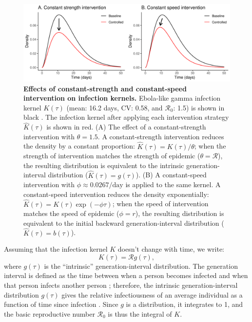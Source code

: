 \documentclass[12pt]{article}
\newcommand{\Rx}[1]{\ensuremath{{\mathcal R}_{#1}}}
\newcommand{\Ro}{\Rx{0}}
\newcommand{\RR}{\ensuremath{{\mathcal R}}}
\newcommand{\figlab}[1]{\label{fig:#1}}
\newcommand{\eqlab}[1]{\label{eq:#1}}
\begin{document}
\begin{figure}[!t]
\includegraphics[width=\textwidth]{../figure/constant_intervention.pdf}
\caption{
\textbf{Effects of constant-strength and constant-speed intervention on infection kernels.}
Ebola-like gamma infection kernel $K(\tau)$ (mean: 16.2 days, CV: 0.58, and \Ro: 1.5) is shown in black \citep{park2019practical}.
The infection kernel after applying each intervention strategy $\hat K(\tau)$ is shown in red.
(A) The effect of a constant-strength intervention with $\theta = 1.5$.
A constant-strength intervention reduces the density by a constant proportion: $\hat K(\tau) = K(\tau)/\theta$; when the strength of intervention matches the strength of epidemic ($\theta = \mathcal R$), the resulting distribution is equivalent to the intrinsic generation-interval distribution ($\hat K(\tau) = g(\tau)$).
(B) A constant-speed intervention with $\phi \approx 0.0267/\mathrm{day}$ is applied to the same kernel.
A constant-speed intervention reduces the density exponentially: $\hat K(\tau) = K(\tau) \exp(-\phi \tau)$; when the speed of intervention matches the speed of epidemic ($\phi = r$), the resulting distribution is equivalent to the initial backward generation-interval distribution ($\hat K(\tau) = b(\tau)$). 
}
\figlab{constant}
\end{figure}

Assuming that the infection kernel $K$ doesn't change with time, we write:
\begin{equation}
	K(\tau) = \RR g(\tau),
	\eqlab{strengthFactors}
\end{equation}
where $g(\tau)$ is the ``intrinsic'' generation-interval distribution.
The generation interval is defined as the time between when a person becomes infected and when that person infects another person \citep{svensson2007note};
therefore, the intrinsic generation-interval distribution $g(\tau)$ gives the relative infectiousness of an average individual as a function of time since infection \citep{champredon2015intrinsic}. 
Since $g$ is a distribution, it integrates to 1, and the basic reproductive number $\Ro$ is thus the integral of $K$.
\end{document}
